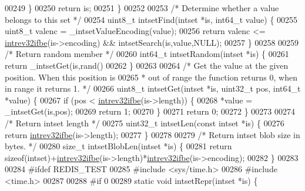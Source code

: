 \begin{DoxyCode}
00249     \}
00250     \textcolor{keywordflow}{return} is;
00251 \}
00252 
00253 \textcolor{comment}{/* Determine whether a value belongs to this set */}
00254 uint8\_t intsetFind(intset *is, int64\_t value) \{
00255     uint8\_t valenc = \_intsetValueEncoding(value);
00256     \textcolor{keywordflow}{return} valenc <= \hyperlink{endianconv_8h_a4e85d9ae58a3b1e6ceaabfd4689002c7}{intrev32ifbe}(is->encoding) && intsetSearch(is,value,NULL);
00257 \}
00258 
00259 \textcolor{comment}{/* Return random member */}
00260 int64\_t intsetRandom(intset *is) \{
00261     \textcolor{keywordflow}{return} \_intsetGet(is,rand()%
00262 \}
00263 
00264 \textcolor{comment}{/* Get the value at the given position. When this position is}
00265 \textcolor{comment}{ * out of range the function returns 0, when in range it returns 1. */}
00266 uint8\_t intsetGet(intset *is, uint32\_t pos, int64\_t *value) \{
00267     \textcolor{keywordflow}{if} (pos < \hyperlink{endianconv_8h_a4e85d9ae58a3b1e6ceaabfd4689002c7}{intrev32ifbe}(is->length)) \{
00268         *value = \_intsetGet(is,pos);
00269         \textcolor{keywordflow}{return} 1;
00270     \}
00271     \textcolor{keywordflow}{return} 0;
00272 \}
00273 
00274 \textcolor{comment}{/* Return intset length */}
00275 uint32\_t intsetLen(\textcolor{keyword}{const} intset *is) \{
00276     \textcolor{keywordflow}{return} \hyperlink{endianconv_8h_a4e85d9ae58a3b1e6ceaabfd4689002c7}{intrev32ifbe}(is->length);
00277 \}
00278 
00279 \textcolor{comment}{/* Return intset blob size in bytes. */}
00280 size\_t intsetBlobLen(intset *is) \{
00281     \textcolor{keywordflow}{return} \textcolor{keyword}{sizeof}(intset)+\hyperlink{endianconv_8h_a4e85d9ae58a3b1e6ceaabfd4689002c7}{intrev32ifbe}(is->length)*\hyperlink{endianconv_8h_a4e85d9ae58a3b1e6ceaabfd4689002c7}{intrev32ifbe}(is->encoding);
00282 \}
00283 
00284 \textcolor{preprocessor}{#}\textcolor{preprocessor}{ifdef} \textcolor{preprocessor}{REDIS\_TEST}
00285 \textcolor{preprocessor}{#}\textcolor{preprocessor}{include} \textcolor{preprocessor}{<}\textcolor{preprocessor}{sys}\textcolor{preprocessor}{/}\textcolor{preprocessor}{time}\textcolor{preprocessor}{.}\textcolor{preprocessor}{h}\textcolor{preprocessor}{>}
00286 \textcolor{preprocessor}{#}\textcolor{preprocessor}{include} \textcolor{preprocessor}{<}\textcolor{preprocessor}{time}\textcolor{preprocessor}{.}\textcolor{preprocessor}{h}\textcolor{preprocessor}{>}
00287 
00288 \textcolor{preprocessor}{#}\textcolor{preprocessor}{if} 0
00289 \textcolor{keyword}{static} \textcolor{keywordtype}{void} intsetRepr(intset *is) \{

\end{DoxyCode}
